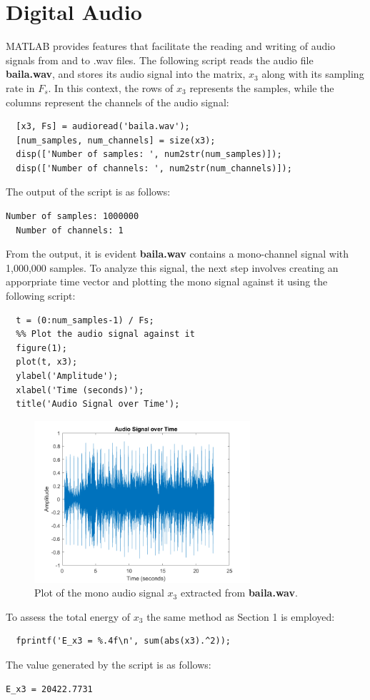 \documentclass[a4paper, 10pt]{article}
\begin{document}
\section{Digital Audio}

MATLAB provides features that facilitate the reading and writing of audio signals from and to .wav files.
The following script reads the audio file \textbf{baila.wav}, and stores its audio signal into the matrix,
$x_3$ along with its sampling rate in $F_s$. In this context, the rows of $x_3$ represents the samples, while
the columns represent the channels of the audio signal:
\begin{lstlisting}[style=Matlab-editor, basicstyle=\small\ttfamily]
  %% Read the audio file baila.wav
  [x3, Fs] = audioread('baila.wav');
  [num_samples, num_channels] = size(x3);
  disp(['Number of samples: ', num2str(num_samples)]);
  disp(['Number of channels: ', num2str(num_channels)]);
\end{lstlisting}
The output of the script is as follows:
\begin{lstlisting}[basicstyle=\small\ttfamily]
  Number of samples: 1000000
  Number of channels: 1
\end{lstlisting}
From the output, it is evident \textbf{baila.wav} contains a mono-channel signal with 1,000,000 samples.
To analyze this signal, the next step involves creating an apporpriate time vector and plotting the mono signal
against it using the following script:
\begin{lstlisting}[style=Matlab-editor, basicstyle=\small\ttfamily]
  %% Create time vector
  t = (0:num_samples-1) / Fs;
  %% Plot the audio signal against it
  figure(1);
  plot(t, x3);
  ylabel('Amplitude');
  xlabel('Time (seconds)');
  title('Audio Signal over Time');
\end{lstlisting}
\begin{figure}[H]
  \centering
  \includegraphics[width=8cm]{images/x3_plot.png}
  \caption{Plot of the mono audio signal $x_3$ extracted from \textbf{baila.wav}.}
\end{figure}
To assess the total energy of $x_3$ the same method as Section 1 is employed:
\begin{lstlisting}[style=Matlab-editor, basicstyle=\small\ttfamily]
  %% Get total energy
  fprintf('E_x3 = %.4f\n', sum(abs(x3).^2));
\end{lstlisting}
The value generated by the script is as follows:
\begin{lstlisting}[basicstyle=\small\ttfamily]
  E_x3 = 20422.7731
\end{lstlisting}
\end{document}
